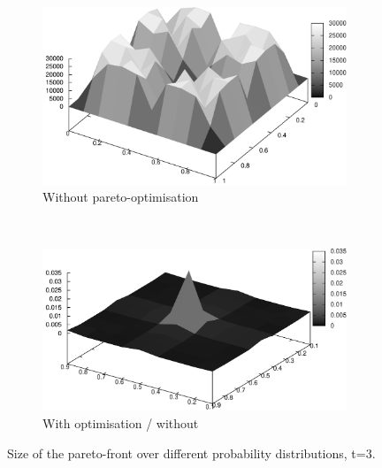 \documentclass{article}
\begin{document}
\begin{figure}
		\begin{subfigure}[b]{0.45\textwidth}
			\centering
			\includegraphics[width=\textwidth]{images/r3_nopareto}
			\caption{Without pareto-optimisation}
			\label{fig:r3_nopareto}
		\end{subfigure}
		~
		\begin{subfigure}[b]{0.45\textwidth}
			\centering
			\includegraphics[width=\textwidth]{images/r3_divided}
			\caption{With optimisation / without}
			\label{fig:r3_divided}
		\end{subfigure}
		\caption{Size of the pareto-front over different probability
		distributions, t=3.}
	\end{figure}
\end{document}
